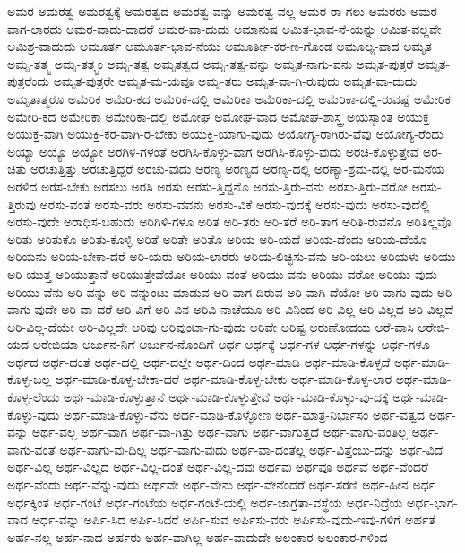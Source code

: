 {ಅಮರ
ಅಮರತ್ವ
ಅಮರತ್ವಕ್ಕೆ
ಅಮರತ್ವದ
ಅಮರತ್ವ-ವನ್ನು
ಅಮರತ್ವ-ವಲ್ಲ
ಅಮರ-ರಾ-ಗಲು
ಅಮರರು
ಅಮರ-ವಾಗ-ಲಾರದು
ಅಮರ-ವಾದು-ದಾದರೆ
ಅಮರ-ವಾ-ದುದು
ಅಮಾನುಷ
ಅಮಿತ-ಭಾವ-ನೆ-ಯನ್ನು
ಅಮಿತ-ವಲ್ಲವೇ
ಅಮಿಶ್ರ-ವಾದುದು
ಅಮೂರ್ತ
ಅಮೂರ್ತ-ಭಾವ-ನೆಯು
ಅಮೂರ್ತೀ-ಕರ-ಣ-ಗೊಂಡ
ಅಮೂಲ್ಯ-ವಾದ
ಅಮೃತ
ಅಮೃ-ತತ್ತ್ವ
ಅಮೃ-ತತ್ತ್ವಂ
ಅಮೃ-ತತ್ವ
ಅಮೃತತ್ವದ
ಅಮೃ-ತತ್ವ-ವನ್ನು
ಅಮೃತ-ನಾಗು-ವನು
ಅಮೃತ-ಪುತ್ರರೆ
ಅಮೃತ-ಪುತ್ರರೆಂದು
ಅಮೃತ-ಪುತ್ರರೇ
ಅಮೃತ-ಮ-ಯವೂ
ಅಮೃ-ತರು
ಅಮೃತ-ವಾ-ಗಿ-ರುವುದು
ಅಮೃತ-ವಾ-ದುದು
ಅಮೃತಾತ್ಮರೂ
ಅಮೆರಿಕ
ಅಮೆರಿ-ಕದ
ಅಮೆರಿಕ-ದಲ್ಲಿ
ಅಮೆರಿಕಾ
ಅಮೆರಿಕಾ-ದಲ್ಲಿ
ಅಮೆರಿಕಾ-ದಲ್ಲಿ-ರುವಷ್ಟೆ
ಅಮೇರಿಕ
ಅಮೇರಿ-ಕದ
ಅಮೇರಿಕಾ
ಅಮೇರಿಕಾ-ದಲ್ಲಿ
ಅಮೋಘ
ಅಮೋಘ-ವಾದ
ಅಮೋಘ-ಶಾಸ್ತ್ರ
ಅಯಸ್ಕಾಂತ
ಅಯುಕ್ತ
ಅಯುಕ್ತ-ವಾಗಿ
ಅಯುಕ್ತಿ-ಕರ-ವಾಗಿ-ರ-ಬೇಕು
ಅಯುಕ್ತಿ-ಯಾಗು-ವುದು
ಅಯೋಗ್ಯ-ರಾಗಿರು-ವೆವು
ಅಯೋಗ್ಯ-ರೆಂದು
ಅಯ್ಯಾ
ಅಯ್ಯೊ
ಅಯ್ಯೋ
ಅರಗಿಳಿ-ಗಳಂತೆ
ಅರಗಿಸಿ-ಕೊಳ್ಳು-ವಾಗ
ಅರಗಿಸಿ-ಕೊಳ್ಳು-ವುದು
ಅರಚಿ-ಕೊಳ್ಳುತ್ತೇವೆ
ಅರ-ಚಿತು
ಅರಚುತ್ತಿತ್ತು
ಅರಚುತ್ತಿದ್ದರೆ
ಅರಚು-ವುದು
ಅರಣ್ಯ
ಅರಣ್ಯದ
ಅರಣ್ಯ-ದಲ್ಲಿ
ಅರಣ್ಯಾ-ಶ್ರಮ-ದಲ್ಲಿ
ಅರ-ಮನೆಯ
ಅರಳಿದ
ಅರಸ-ಬೇಕು
ಅರಸಲು
ಅರಸಿ
ಅರಸು
ಅರಸು-ತ್ತಿದ್ದನೊ
ಅರಸು-ತ್ತಿರು-ವನು
ಅರಸು-ತ್ತಿರು-ವರೋ
ಅರಸು-ತ್ತಿರುವು
ಅರಸು-ವಂತೆ
ಅರಸು-ವರು
ಅರಸು-ವವನು
ಅರಸು-ವಿಕೆ
ಅರಸು-ವುದಕ್ಕೆ
ಅರಸು-ವುದು
ಅರಸು-ವುದೆಲ್ಲಿ
ಅರಸು-ವುದೇ
ಅರಾಧಿಸ-ಬಹುದು
ಅರಿಗಿಳಿ-ಗಳೂ
ಅರಿತ
ಅರಿ-ತರು
ಅರಿ-ತರೆ
ಅರಿ-ತಾಗ
ಅರಿತಿ-ರುವನೊ
ಅರಿತಿಲ್ಲವೊ
ಅರಿತು
ಅರಿತುಕೊ
ಅರಿತು-ಕೊಳ್ಳಿ
ಅರಿತೆ
ಅರಿತೇ
ಅರಿತೊ
ಅರಿಯ
ಅರಿ-ಯದೆ
ಅರಿಯ-ದೆಂದು
ಅರಿಯ-ದೆಯೊ
ಅರಿಯನು
ಅರಿಯ-ಬೇಕಾ-ದರೆ
ಅರಿ-ಯರು
ಅರಿಯ-ಲಾರರು
ಅರಿಯ-ಲಿಚ್ಛಿಸು-ವನು
ಅರಿ-ಯಲು
ಅರಿಯಳು
ಅರಿಯು
ಅರಿ-ಯುತ್ತ
ಅರಿಯುತ್ತಾನೆ
ಅರಿಯುತ್ತೇವೆಯೋ
ಅರಿಯು-ವಂತೆ
ಅರಿಯು-ವನು
ಅರಿಯು-ವರೋ
ಅರಿಯು-ವುದು
ಅರಿಯು-ವೆನು
ಅರಿ-ವನ್ನು
ಅರಿ-ವನ್ನುಂಟು-ಮಾಡುವ
ಅರಿ-ವಾಗ-ದಿರುವ
ಅರಿ-ವಾಗಿ-ದೆಯೋ
ಅರಿ-ವಾಗು-ವುದು
ಅರಿ-ವಾಗು-ವುದೇ
ಅರಿ-ವಾ-ದರೆ
ಅರಿ-ವಿಗೆ
ಅರಿ-ವಿನ
ಅರಿವಿ-ನಾಚೆಯೂ
ಅರಿ-ವಿನಿಂದ
ಅರಿ-ವಿಲ್ಲ
ಅರಿ-ವಿಲ್ಲದ
ಅರಿ-ವಿಲ್ಲದೆ
ಅರಿ-ವಿಲ್ಲ-ದೆಯೇ
ಅರಿ-ವಿಲ್ಲದೇ
ಅರಿವು
ಅರಿವುಂಟಾ-ಗು-ವುದು
ಅರಿವೇ
ಅರಿಷ್ಟ
ಅರುಣೋದಯ
ಅರೆ-ವಾಸಿ
ಅರೇಬಿ-ಯದ
ಅರೇಬಿಯಾ
ಅರ್ಜುನ-ನಿಗೆ
ಅರ್ಜುನ-ನೊಂದಿಗೆ
ಅರ್ಥ
ಅರ್ಥಕ್ಕೆ
ಅರ್ಥ-ಗಳ
ಅರ್ಥ-ಗಳನ್ನು
ಅರ್ಥ-ಗಳೂ
ಅರ್ಥದ
ಅರ್ಥ-ದಂತೆ
ಅರ್ಥ-ದಲ್ಲಿ
ಅರ್ಥ-ದಲ್ಲೇ
ಅರ್ಥ-ದಿಂದ
ಅರ್ಥ-ಮಾಡಿ
ಅರ್ಥ-ಮಾಡಿ-ಕೊಳ್ಳದೆ
ಅರ್ಥ-ಮಾಡಿ-ಕೊಳ್ಳ-ಬಲ್ಲ
ಅರ್ಥ-ಮಾಡಿ-ಕೊಳ್ಳ-ಬೇಕಾ-ದರೆ
ಅರ್ಥ-ಮಾಡಿ-ಕೊಳ್ಳ-ಬೇಕು
ಅರ್ಥ-ಮಾಡಿ-ಕೊಳ್ಳ-ಲಾರ
ಅರ್ಥ-ಮಾಡಿ-ಕೊಳ್ಳ-ಲೆಂದು
ಅರ್ಥ-ಮಾಡಿ-ಕೊಳ್ಳುತ್ತಾನೆ
ಅರ್ಥ-ಮಾಡಿ-ಕೊಳ್ಳುತ್ತೇವೆ
ಅರ್ಥ-ಮಾಡಿ-ಕೊಳ್ಳು-ವು-ದಕ್ಕೆ
ಅರ್ಥ-ಮಾಡಿ-ಕೊಳ್ಳು-ವುದು
ಅರ್ಥ-ಮಾಡಿ-ಕೊಳ್ಳು-ವೆನು
ಅರ್ಥ-ಮಾಡಿ-ಕೊಳ್ಳೋಣ
ಅರ್ಥ-ಮಾತ್ರ-ನಿರ್ಭಾಸಂ
ಅರ್ಥ-ವತ್ವದ
ಅರ್ಥ-ವನ್ನು
ಅರ್ಥ-ವಲ್ಲ
ಅರ್ಥ-ವಾಗ
ಅರ್ಥ-ವಾ-ಗಿತ್ತು
ಅರ್ಥ-ವಾಗು
ಅರ್ಥ-ವಾಗುತ್ತದೆ
ಅರ್ಥ-ವಾಗು-ವಂತಿಲ್ಲ
ಅರ್ಥ-ವಾಗು-ವಂತೆ
ಅರ್ಥ-ವಾಗು-ವು-ದಿಲ್ಲ
ಅರ್ಥ-ವಾಗು-ವುದು
ಅರ್ಥ-ವಾ-ದಂತೆಲ್ಲ
ಅರ್ಥ-ವಿತ್ತೆಂಬು-ದನ್ನು
ಅರ್ಥ-ವಿದೆ
ಅರ್ಥ-ವಿಲ್ಲ
ಅರ್ಥ-ವಿಲ್ಲದ
ಅರ್ಥ-ವಿಲ್ಲ-ದಂತೆ
ಅರ್ಥ-ವಿಲ್ಲ-ದವು
ಅರ್ಥವು
ಅರ್ಥವೂ
ಅರ್ಥವೆ
ಅರ್ಥ-ವೆಂದರೆ
ಅರ್ಥ-ವೆಂದು
ಅರ್ಥ-ವೆನ್ನು-ವುದು
ಅರ್ಥವೇ
ಅರ್ಥ-ವೇನು
ಅರ್ಥ-ವೇನೆಂದರೆ
ಅರ್ಥ-ಸರಣಿ
ಅರ್ಥ-ಹೀನ
ಅರ್ಧ
ಅರ್ಧಕ್ಕಿಂತ
ಅರ್ಧ-ಗಂಟೆ
ಅರ್ಧ-ಗಂಟೆಯ
ಅರ್ಧ-ಗಂಟೆ-ಯಲ್ಲಿ
ಅರ್ಧ-ಜಾಗ್ರತಾ-ವಸ್ಥೆಯ
ಅರ್ಧ-ನಿದ್ರೆಯ
ಅರ್ಧ-ಭಾಗ-ವಾದ
ಅರ್ಧ-ವನ್ನು
ಅರ್ಪಿ-ಸಿದ
ಅರ್ಪಿ-ಸಿದರೆ
ಅರ್ಪಿ-ಸುವ
ಅರ್ಪಿಸು-ವರು
ಅರ್ಪಿಸು-ವುದು-ಇವು-ಗಳಿಗೆ
ಅರ್ಹತೆ
ಅರ್ಹ-ನಲ್ಲ
ಅರ್ಹ-ನಾದ
ಅರ್ಹರು
ಅರ್ಹ-ವಾಗಿಲ್ಲ
ಅರ್ಹ-ವಾದುದೇ
ಅಲಂಕಾರ
ಅಲಂಕಾರ-ಗಳಿಂದ
}
